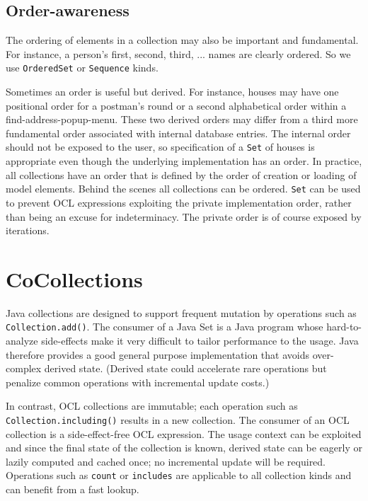 \documentclass[
]{ceurart}
\begin{document}
\subsection{Order-awareness}

The ordering of elements in a collection may also be important and fundamental. For instance, a person's first, second, third, ... names are clearly ordered. So we use \verb!OrderedSet! or \verb!Sequence! kinds. 

Sometimes an order is useful but derived. For instance, houses may have one positional order for a postman's round or a second alphabetical order within a find-address-popup-menu. These two derived orders may differ from a third more fundamental  order associated with internal database entries. The internal order should not be exposed to the user, so specification of a \verb!Set! of houses is appropriate even though the underlying implementation has an order. In practice, all collections have an order that is defined by the order of creation or loading of model elements. Behind the scenes all collections can be ordered. \verb!Set! can be used to prevent OCL expressions exploiting the private implementation order, rather than being an excuse for indeterminacy. The private order is of course exposed by iterations. 

\section{CoCollections}\label{CoCollections}

Java collections are designed to support frequent mutation by operations such as \verb!Collection.add()!. The consumer of a Java Set is a Java program whose hard-to-analyze side-effects make it very difficult to tailor performance to the usage. Java therefore provides a good general purpose implementation that avoids over-complex derived state. (Derived state could accelerate rare operations but penalize common operations with incremental update costs.)

In contrast, OCL collections are immutable; each operation such as \verb!Collection.including()! results in a new collection. The consumer of an OCL collection is a side-effect-free OCL expression. The usage context can be exploited and since the final state of the collection is known, derived state can be eagerly or lazily computed and cached once; no incremental update will be required. Operations such as \verb!count! or \verb!includes! are applicable to all collection kinds and can benefit from a fast lookup.
\end{document}
